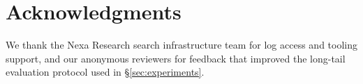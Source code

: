 \section*{Acknowledgments}
{\small We thank the Nexa Research search infrastructure team for log access and
tooling support, and our anonymous reviewers for feedback that improved the
long-tail evaluation protocol used in \S\ref{sec:experiments}.}



